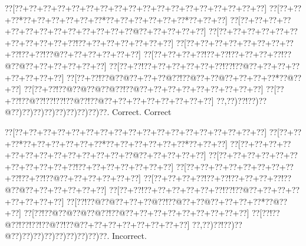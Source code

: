 \documentclass[a5paper]{article}
\begin{document}
\begin{center}
{\goo
\0??[\0??+\0??+\0??+\0??+\0??+\0??+\0??+\0??+\0??+\0??+\0??+\0??+\0??+\0??+\0??+\0??+\0??+\0??]
\0??[\0??+\0??+\0??*\0??+\0??+\0??+\0??+\0??+\0??*\0??+\0??+\0??+\0??+\0??+\0??*\0??+\0??+\0??]
\0??[\0??+\0??+\0??+\0??+\0??+\0??+\0??+\0??+\0??+\0??+\0??+\0??+\0??@\0??+\0??+\0??+\0??+\0??]
\0??[\0??+\0??+\0??+\0??+\0??+\0??+\0??+\0??+\0??+\0??+\0??!\0??+\0??+\0??+\0??+\0??+\0??+\0??]
\0??[\0??+\0??+\0??+\0??+\0??+\0??+\0??+\0??+\0??!\0??+\0??!\0??@\0??+\0??+\0??+\0??+\0??+\0??]
\0??[\0??+\0??+\0??+\0??!\0??+\0??!\0??+\0??+\0??+\0??!\0??@\0??@\0??+\0??+\0??+\0??+\0??+\0??]
\0??[\0??+\0??!\0??+\0??+\0??+\0??+\0??+\0??!\0??!\0??@\0??+\0??+\0??+\0??+\0??+\0??+\0??+\0??]
\0??[\0??+\0??!\0??@\0??@\0??+\0??+\0??@\0??!\0??@\0??+\0??@\0??+\0??+\0??+\0??*\0??@\0??+\0??]
\0??[\0??+\0??!\0??@\0??@\0??@\0??@\0??!\0??@\0??+\0??+\0??+\0??+\0??+\0??+\0??+\0??+\0??]
\0??[\0??+\0??!\0??@\0??!\0??!\0??!\0??@\0??!\0??@\0??+\0??+\0??+\0??+\0??+\0??+\0??+\0??]
\0??,\0??)\0??!\0??)\0??@\0??)\0??)\0??)\0??)\0??)\0??)\0??)\0??)\0??.
}
Correct. Correct

\end{center}
\begin{center}
{\goo
\0??[\0??+\0??+\0??+\0??+\0??+\0??+\0??+\0??+\0??+\0??+\0??+\0??+\0??+\0??+\0??+\0??+\0??+\0??]
\0??[\0??+\0??+\0??*\0??+\0??+\0??+\0??+\0??+\0??*\0??+\0??+\0??+\0??+\0??+\0??*\0??+\0??+\0??]
\0??[\0??+\0??+\0??+\0??+\0??+\0??+\0??+\0??+\0??+\0??+\0??+\0??+\0??@\0??+\0??+\0??+\0??+\0??]
\0??[\0??+\0??+\0??+\0??+\0??+\0??+\0??+\0??+\0??+\0??+\0??!\0??+\0??+\0??+\0??+\0??+\0??+\0??]
\0??[\0??+\0??+\0??+\0??+\0??+\0??+\0??+\0??+\0??!\0??+\0??!\0??@\0??+\0??+\0??+\0??+\0??+\0??]
\0??[\0??+\0??+\0??+\0??!\0??+\0??!\0??+\0??+\0??+\0??!\0??@\0??@\0??+\0??+\0??+\0??+\0??+\0??]
\0??[\0??+\0??!\0??+\0??+\0??+\0??+\0??+\0??!\0??!\0??@\0??+\0??+\0??+\0??+\0??+\0??+\0??+\0??]
\0??[\0??!\0??@\0??@\0??+\0??+\0??@\0??!\0??@\0??+\0??@\0??+\0??+\0??+\0??*\0??@\0??+\0??]
\0??[\0??!\0??@\0??@\0??@\0??@\0??!\0??@\0??+\0??+\0??+\0??+\0??+\0??+\0??+\0??+\0??]
\0??[\0??!\0??@\0??!\0??!\0??!\0??@\0??!\0??@\0??+\0??+\0??+\0??+\0??+\0??+\0??+\0??]
\0??,\0??)\0??!\0??)\0??@\0??)\0??)\0??)\0??)\0??)\0??)\0??)\0??)\0??.
}
Incorrect. 

\end{center}
\newpage
\end{document}
